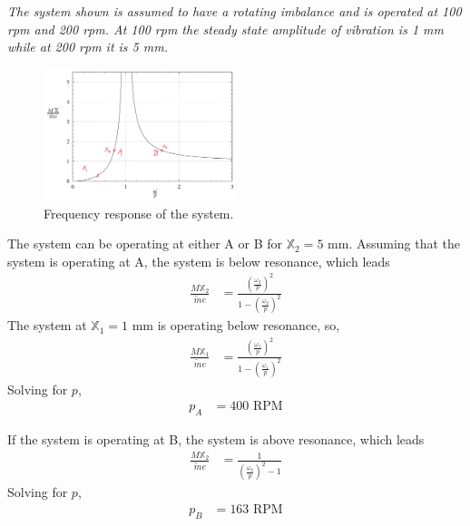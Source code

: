 \section{}
\textit{The system shown is assumed to have a rotating imbalance and is operated at 100 rpm and 200 rpm. At 100 rpm the steady state amplitude of vibration is 1 mm while at 200 rpm it is 5 mm.}

\begin{figure}[H]
    \centering
    \includegraphics[width=0.5\textwidth]{Questions/Figures/Q3 Frequency Response.png}
    \caption{Frequency response of the system.}
    \label{fig:Q3}
\end{figure}

The system can be operating at either A or B for $\mathbb{X}_2 = 5$ mm. Assuming that the system is operating at A, the system is below resonance, which leads
\begin{align*}
    \frac{M \mathbb{X}_2}{\tilde{m}e} &= \frac{\left(\frac{\omega_2}{p}\right)^2}{1 - \left(\frac{\omega_2}{p}\right)^2} 
\end{align*}
The system at $\mathbb{X}_1 = 1$ mm is operating below resonance, so,
\begin{align*}
    \frac{M \mathbb{X}_1}{\tilde{m}e} &= \frac{\left(\frac{\omega_1}{p}\right)^2}{1 - \left(\frac{\omega_1}{p}\right)^2}
\end{align*}
Solving for $p$,
\begin{align*}
    p_{A} &= 400 \text{ RPM}
\end{align*}

If the system is operating at B, the system is above resonance, which leads
\begin{align*}
    \frac{M \mathbb{X}_2}{\tilde{m}e} &= \frac{1}{\left(\frac{\omega_2}{p}\right)^2 - 1}
\end{align*}
Solving for $p$,
\begin{align*}
    p_{B} &= 163 \text{ RPM}
\end{align*}

